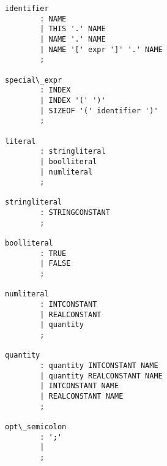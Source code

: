 \begin{Verbatim}[commandchars=\\\{\}]
identifier
        : NAME
        | THIS '.' NAME
        | NAME '.' NAME
        | NAME '[' expr ']' '.' NAME
        ;

special\_expr
        : INDEX
        | INDEX '(' ')'
        | SIZEOF '(' identifier ')'
        ;

literal
        : stringliteral
        | boolliteral
        | numliteral
        ;

stringliteral
        : STRINGCONSTANT
        ;

boolliteral
        : TRUE
        | FALSE
        ;

numliteral
        : INTCONSTANT
        | REALCONSTANT
        | quantity
        ;

quantity
        : quantity INTCONSTANT NAME
        | quantity REALCONSTANT NAME
        | INTCONSTANT NAME
        | REALCONSTANT NAME
        ;

opt\_semicolon
        : ';'
        |
        ;

\end{Verbatim}


